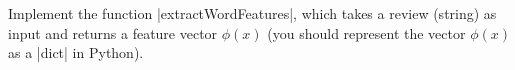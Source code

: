 \item {}

Implement the function |extractWordFeatures|, which takes a review (string)
as input and returns a feature vector $\phi(x)$ (you should represent the vector
$\phi(x)$ as a |dict| in Python).
